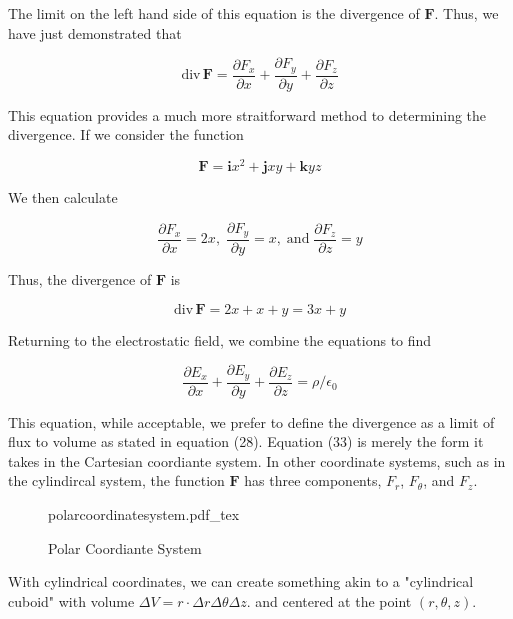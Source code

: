 \documentclass[11pt]{article}
\newcommand{\incfig}[2][1]{%
    \def\svgwidth{#1\columnwidth}
    {#2.pdf_tex}
}
\begin{document}
The limit on the left hand side of this equation is the divergence of $\mathbf{F}$. Thus, we have just demonstrated that

\begin{equation}
	\text{div} \, \mathbf{F} = \frac{\partial F_x}{\partial x} + \frac{\partial F_y}{\partial y} + \frac{\partial F_z}{\partial z}
\end{equation}

This equation provides a much more straitforward method to determining the divergence. If we consider the function

\begin{equation}
\mathbf{F} = \mathbf{i}x^2 + \mathbf{j}xy + \mathbf{k}yz
\end{equation}

We then calculate

\begin{equation}
	\frac{\partial F_x}{\partial x} = 2x, \; \frac{\partial F_y}{\partial y} = x, \; \text{and} \; \frac{\partial F_z}{\partial z} = y
\end{equation}

Thus, the divergence of $\mathbf{F}$ is

\begin{equation}
	\text{div} \, \mathbf{F} = 2x + x + y = 3x + y
\end{equation}

Returning to the electrostatic field, we combine the equations to find
 
\begin{equation}
	\frac{\partial E_x}{\partial x} + \frac{ \partial E_y}{\partial y} + \frac{\partial E_z}{\partial z} = \rho / \epsilon_0
\end{equation}

This equation, while acceptable, we prefer to define the divergence as a limit of flux to volume as stated in equation (28). Equation (33) is merely the form it takes in the Cartesian coordiante system. In other coordinate systems, such as in the cylindircal system, the function $\mathbf{F}$ has three components,  $F_r$, $F_\theta$, and $F_z$.

\begin{figure}[ht]
    \centering
    \incfig{polarcoordinatesystem}
    \caption{Polar Coordiante System}
    \label{fig:polarcoordinatesystem}
\end{figure}

With cylindrical coordinates, we can create something akin to a "cylindrical cuboid" with volume $\Delta V = r \cdot \Delta r \Delta \theta \Delta z.$ and centered at the point  $(r, \theta, z)$.
\end{document}
